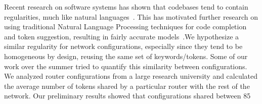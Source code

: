 Recent research on software systems has shown that codebases tend to contain regularities, much like natural languages~\cite{naturalness}. This has motivated further research on using traditional Natural Language Processing techniques for code completion and token suggestion, resulting in fairly accurate models~\cite{naturalness, raychev}.We hypothesize a similar regularity for network configurations, especially since they tend to be homogeneous by design, reusing the same set of keywords/tokens. Some of our work over the summer tried to quantify this similarity between configurations. We analyzed router configurations from a large research university and calculated the average number of tokens shared by a particular router with the rest of the network. Our preliminary results showed that configurations shared between 85%